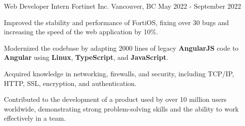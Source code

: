 

\begin{cventries}

	\cventry
	{Web Developer Intern } %
	{Fortinet Inc. } %
	{Vancouver, BC } %
	{May 2022 - September 2022} %
	{
		\begin{cvitems} %
			\item {Improved the stability and performance of FortiOS, fixing over 30 bugs and increasing the speed of the web application by 10\%.}
			\item {Modernized the codebase by adapting 2000 lines of legacy \textbf{AngularJS} code to \textbf{Angular} using \textbf{Linux}, \textbf{TypeScript}, and \textbf{JavaScript}.}
			\item {Acquired knowledge in networking, firewalls, and security, including TCP/IP, HTTP, SSL, encryption, and authentication.}
			\item {Contributed to the development of a product used by over 10 million users worldwide, demonstrating strong problem-solving skills and the ability to work effectively in a team.}
		\end{cvitems}
	}


\end{cventries}
